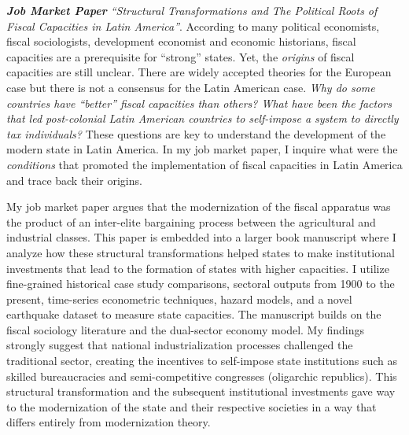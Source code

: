 \documentclass[11pt]{letter} %
\begin{document}
\begin{letter}{}
\emph{{\bf Job Market Paper} ``Structural Transformations and The Political Roots of Fiscal Capacities in Latin America''}. According  to many political economists, fiscal sociologists, development economist and economic historians, fiscal capacities are a prerequisite for ``strong'' states. Yet, the \emph{origins} of fiscal capacities are still unclear. There are widely accepted theories for the European case but there is not a consensus for the Latin American case. \emph{Why do some countries have ``better'' fiscal capacities than others? What have been the factors that led post-colonial Latin American countries to self-impose a system to directly tax individuals?} These questions are key to understand the development of the modern state in Latin America. In my job market paper, I inquire what were the \emph{conditions} that promoted the implementation of fiscal capacities in Latin America and trace back their origins.


My job market paper argues that the modernization of the fiscal apparatus was the product of an inter-elite bargaining process between the agricultural and industrial classes. This paper is embedded into a larger book manuscript where I analyze how these structural transformations helped states to make institutional investments that lead to the formation of states with higher capacities. I utilize fine-grained historical case study comparisons, sectoral outputs from 1900 to the present, time-series econometric techniques, hazard models, and a novel earthquake dataset to measure state capacities. The manuscript builds on the fiscal sociology literature and the dual-sector economy model. My findings strongly suggest that national industrialization processes challenged the traditional sector, creating the incentives to self-impose state institutions such as skilled bureaucracies and semi-competitive congresses (oligarchic republics). This structural transformation and the subsequent institutional investments gave way to the modernization of the state and their respective societies in a way that differs entirely from modernization theory.


\end{letter}
\end{document}

